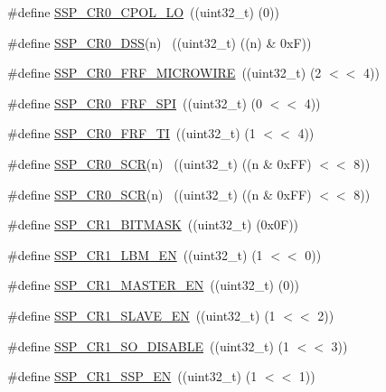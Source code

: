 \begin{DoxyCompactItemize}
\item 
\#define \hyperlink{group__SSP__17XX__40XX_gab4353fed07ef845a3796e154397f7e76}{S\+S\+P\+\_\+\+C\+R0\+\_\+\+C\+P\+O\+L\+\_\+\+LO}~((uint32\+\_\+t) (0))
\item 
\#define \hyperlink{group__SSP__17XX__40XX_ga2d75ec18f2de7c9e24f69a3242ceee72}{S\+S\+P\+\_\+\+C\+R0\+\_\+\+D\+SS}(n)                ~((uint32\+\_\+t) ((n) \& 0x\+F))
\item 
\#define \hyperlink{group__SSP__17XX__40XX_ga7ca858fcf0f529a38e1e1bf0a69d4486}{S\+S\+P\+\_\+\+C\+R0\+\_\+\+F\+R\+F\+\_\+\+M\+I\+C\+R\+O\+W\+I\+RE}~((uint32\+\_\+t) (2 $<$$<$ 4))
\item 
\#define \hyperlink{group__SSP__17XX__40XX_ga4f0f58a8f4b87af0f18e84b981c31a74}{S\+S\+P\+\_\+\+C\+R0\+\_\+\+F\+R\+F\+\_\+\+S\+PI}~((uint32\+\_\+t) (0 $<$$<$ 4))
\item 
\#define \hyperlink{group__SSP__17XX__40XX_ga54c718a1a75a1e5e06417b9f8267ee27}{S\+S\+P\+\_\+\+C\+R0\+\_\+\+F\+R\+F\+\_\+\+TI}~((uint32\+\_\+t) (1 $<$$<$ 4))
\item 
\#define \hyperlink{group__SSP__17XX__40XX_gaed4d66acb278ca43b6bc784b6031ee7f}{S\+S\+P\+\_\+\+C\+R0\+\_\+\+S\+CR}(n)        ~((uint32\+\_\+t) ((n \& 0x\+F\+F) $<$$<$ 8))
\item 
\#define \hyperlink{group__SSP__17XX__40XX_gaed4d66acb278ca43b6bc784b6031ee7f}{S\+S\+P\+\_\+\+C\+R0\+\_\+\+S\+CR}(n)        ~((uint32\+\_\+t) ((n \& 0x\+F\+F) $<$$<$ 8))
\item 
\#define \hyperlink{group__SSP__17XX__40XX_gad90a9c1c97a5c4e19e048e9686a4d8fa}{S\+S\+P\+\_\+\+C\+R1\+\_\+\+B\+I\+T\+M\+A\+SK}~((uint32\+\_\+t) (0x0\+F))
\item 
\#define \hyperlink{group__SSP__17XX__40XX_gac0e5bef37b94df5ad96bf270aa802dcd}{S\+S\+P\+\_\+\+C\+R1\+\_\+\+L\+B\+M\+\_\+\+EN}~((uint32\+\_\+t) (1 $<$$<$ 0))
\item 
\#define \hyperlink{group__SSP__17XX__40XX_gaa8e064b00be6db00e597ad2509a633c3}{S\+S\+P\+\_\+\+C\+R1\+\_\+\+M\+A\+S\+T\+E\+R\+\_\+\+EN}~((uint32\+\_\+t) (0))
\item 
\#define \hyperlink{group__SSP__17XX__40XX_ga483d570ffc25bc917c99b3e8ece75649}{S\+S\+P\+\_\+\+C\+R1\+\_\+\+S\+L\+A\+V\+E\+\_\+\+EN}~((uint32\+\_\+t) (1 $<$$<$ 2))
\item 
\#define \hyperlink{group__SSP__17XX__40XX_gaf8cd75ca0bf07a236b992cca4769b4dc}{S\+S\+P\+\_\+\+C\+R1\+\_\+\+S\+O\+\_\+\+D\+I\+S\+A\+B\+LE}~((uint32\+\_\+t) (1 $<$$<$ 3))
\item 
\#define \hyperlink{group__SSP__17XX__40XX_gaad500ed8cec6c1734a12a7f55ff6ec26}{S\+S\+P\+\_\+\+C\+R1\+\_\+\+S\+S\+P\+\_\+\+EN}~((uint32\+\_\+t) (1 $<$$<$ 1))
$$
\end{DoxyCompactItemize}
